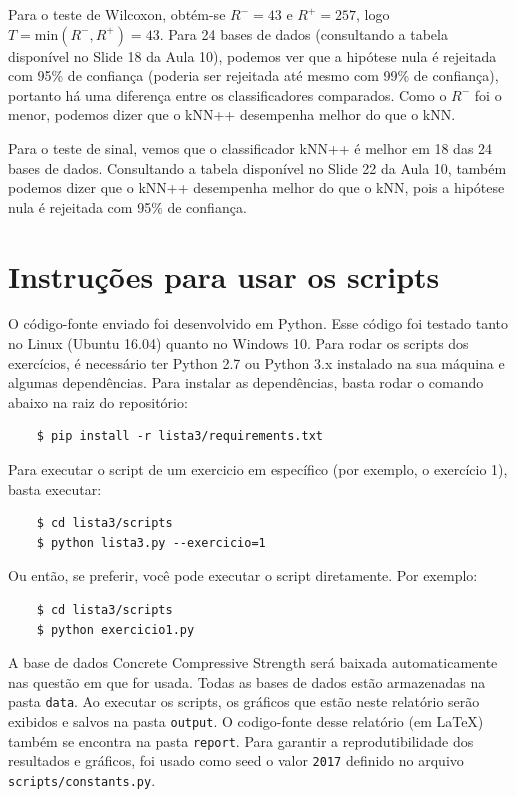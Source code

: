 \documentclass{article}
\begin{document}
Para o teste de Wilcoxon, obtém-se $R^{-}=43$ e $R^{+}=257$, logo $T=\text{min}(R^{-}, R^{+})=43$. Para 24 bases de dados (consultando a tabela disponível no Slide 18 da Aula 10), podemos ver que a hipótese nula é rejeitada com 95\% de confiança (poderia ser rejeitada até mesmo com 99\% de confiança), portanto há uma diferença entre os classificadores comparados. Como o $R^{-}$ foi o menor, podemos dizer que o kNN++ desempenha melhor do que o kNN.

Para o teste de sinal, vemos que o classificador kNN++ é melhor em 18 das 24 bases de dados. Consultando a tabela disponível no Slide 22 da Aula 10, também podemos dizer que o kNN++ desempenha melhor do que o kNN, pois a hipótese nula é rejeitada com 95\% de confiança.


\section*{Instruções para usar os scripts}

O código-fonte enviado foi desenvolvido em Python. Esse código foi testado tanto no Linux (Ubuntu 16.04) quanto no Windows 10. Para rodar os scripts dos exercícios, é necessário ter Python 2.7 ou Python 3.x instalado na sua máquina e algumas dependências. Para instalar as dependências, basta rodar o comando abaixo na raiz do repositório:

\begin{verbatim}
	$ pip install -r lista3/requirements.txt
\end{verbatim}

Para executar o script de um exercicio em específico (por exemplo, o exercício 1), basta executar:

\begin{verbatim}
	$ cd lista3/scripts
	$ python lista3.py --exercicio=1
\end{verbatim}

Ou então, se preferir, você pode executar o script diretamente. Por exemplo:

\begin{verbatim}
	$ cd lista3/scripts
	$ python exercicio1.py
\end{verbatim}

A base de dados Concrete Compressive Strength será baixada automaticamente nas questão em que for usada. Todas as bases de dados estão armazenadas na pasta \texttt{data}. Ao executar os scripts, os gráficos que estão neste relatório serão exibidos e salvos na pasta \texttt{output}. O codigo-fonte desse relatório (em \LaTeX) também se encontra na pasta \texttt{report}. Para garantir a reprodutibilidade dos resultados e gráficos, foi usado como seed o valor \texttt{2017} definido no arquivo \texttt{scripts/constants.py}.
\end{document}
